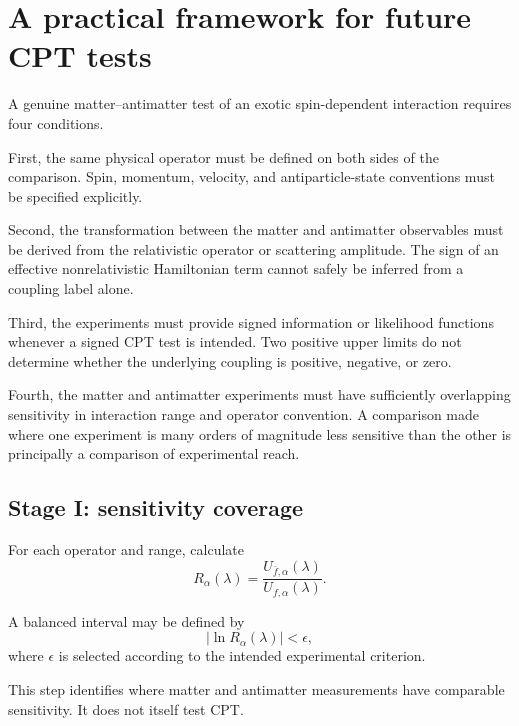 \documentclass[aps,prd,reprint,superscriptaddress,nofootinbib]{revtex4-2}
\begin{document}
	\section{A practical framework for future CPT tests}
	
	A genuine matter--antimatter test of an exotic spin-dependent
	interaction requires four conditions.
	
	First, the same physical operator must be defined on both sides of the
	comparison. Spin, momentum, velocity, and antiparticle-state
	conventions must be specified explicitly.
	
	Second, the transformation between the matter and antimatter
	observables must be derived from the relativistic operator or
	scattering amplitude. The sign of an effective nonrelativistic
	Hamiltonian term cannot safely be inferred from a coupling label alone.
	
	Third, the experiments must provide signed information or likelihood
	functions whenever a signed CPT test is intended. Two positive upper
	limits do not determine whether the underlying coupling is positive,
	negative, or zero.
	
	Fourth, the matter and antimatter experiments must have sufficiently
	overlapping sensitivity in interaction range and operator convention.
	A comparison made where one experiment is many orders of magnitude
	less sensitive than the other is principally a comparison of
	experimental reach.
	
	\subsection{Stage I: sensitivity coverage}
	
	For each operator and range, calculate
	\begin{equation}
		R_\alpha(\lambda)
		=
		\frac{U_{\bar f,\alpha}(\lambda)}
		{U_{f,\alpha}(\lambda)}.
	\end{equation}
	
	A balanced interval may be defined by
	\begin{equation}
		|\ln R_\alpha(\lambda)|<\epsilon,
		\label{eq:balanced}
	\end{equation}
	where $\epsilon$ is selected according to the intended experimental
	criterion.
	
	This step identifies where matter and antimatter measurements have
	comparable sensitivity. It does not itself test CPT.
	
\end{document}
